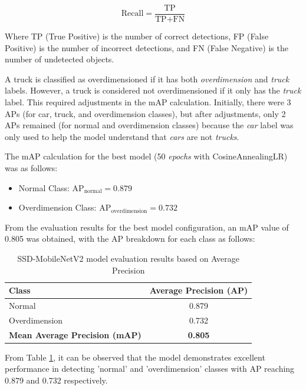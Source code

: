 \begin{equation}
\mbox{Recall} = \frac{\mbox{TP}}{\mbox{TP} + \mbox{FN}}
\label{eq:recall}
\end{equation}

Where TP (True Positive) is the number of correct detections, FP (False Positive) is the number of incorrect detections, and FN (False Negative) is the number of undetected objects.

A truck is classified as overdimensioned if it has both \emph{overdimension} and \emph{truck} labels. However, a truck is considered not overdimensioned if it only has the \emph{truck} label. This required adjustments in the mAP calculation. Initially, there were 3 APs (for car, truck, and overdimension classes), but after adjustments, only 2 APs remained (for normal and overdimension classes) because the \emph{car} label was only used to help the model understand that \emph{cars} are not \emph{trucks}.

The mAP calculation for the best model (50 \emph{epochs} with CosineAnnealingLR) was as follows:

\begin{itemize}
  \item Normal Class: $\mbox{AP}_{\mbox{normal}} = 0.879$
  \item Overdimension Class: $\mbox{AP}_{\mbox{overdimension}} = 0.732$
\end{itemize}

From the evaluation results for the best model configuration, an mAP value of 0.805 was obtained, with the AP breakdown for each class as follows:

\begin{table}[htbp]
  \centering
  \begin{tabular}{|l|c|}
    \hline
    \rowcolor[HTML]{C0C0C0}
    \textbf{Class} & \textbf{Average Precision (AP)} \\
    \hline
    Normal & 0.879 \\
    \hline
    Overdimension & 0.732 \\
    \hline
    \textbf{Mean Average Precision (mAP)} & \textbf{0.805} \\
    \hline
  \end{tabular}
  \caption{SSD-MobileNetV2 model evaluation results based on Average Precision}
  \label{tab:ap_results}
\end{table}

From Table \ref{tab:ap_results}, it can be observed that the model demonstrates excellent performance in detecting 'normal' and 'overdimension' classes with AP reaching 0.879 and 0.732 respectively.

